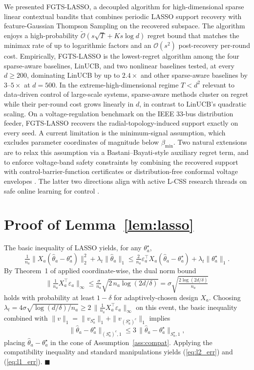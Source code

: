 \documentclass[10pt,journal,twoside,twocolumn]{IEEEtran}
\begin{document}
We presented FGTS-LASSO, a decoupled algorithm for high-dimensional sparse linear contextual bandits that combines periodic LASSO support recovery with feature-Gaussian Thompson Sampling on the recovered subspace. The algorithm enjoys a high-probability $\tilde{\mathcal{O}}(s\sqrt{T} + Ks\log d)$ regret bound that matches the minimax rate of \cite{hao2020high} up to logarithmic factors and an $\mathcal{O}(s^2)$ post-recovery per-round cost. Empirically, FGTS-LASSO is the lowest-regret algorithm among the four sparse-aware baselines, LinUCB, and two nonlinear baselines tested, at every $d \geq 200$, dominating LinUCB by up to $2.4\times$ and other sparse-aware baselines by $3$--$5\times$ at $d = 500$. In the extreme-high-dimensional regime $T < d^2$ relevant to data-driven control of large-scale systems, sparse-aware methods cluster on regret while their per-round cost grows linearly in $d$, in contrast to LinUCB's quadratic scaling. On a voltage-regulation benchmark on the IEEE 33-bus distribution feeder, FGTS-LASSO recovers the radial-topology-induced support exactly on every seed. A current limitation is the minimum-signal assumption, which excludes parameter coordinates of magnitude below $\beta_{\min}$. Two natural extensions are to relax this assumption via a Bastani--Bayati-style auxiliary regret term, and to enforce voltage-band safety constraints by combining the recovered support with control-barrier-function certificates \cite{ames2017cbf} or distribution-free conformal voltage envelopes \cite{vovk2005algorithmic}. The latter two directions align with active L-CSS research threads on safe online learning for control \cite{capone2024learning}.

\appendices

\section{Proof of Lemma~\ref{lem:lasso}}\label{app:lasso}

The basic inequality of LASSO yields, for any $\theta^\star_a$,
\[
\tfrac{1}{n_a}\|X_a(\hat\theta_a - \theta^\star_a)\|_2^2 + \lambda_t \|\hat\theta_a\|_1 \leq \tfrac{2}{n_a}\varepsilon_a^\top X_a (\hat\theta_a - \theta^\star_a) + \lambda_t \|\theta^\star_a\|_1.
\]
By Theorem~1 of \cite{abbasi2011improved} applied coordinate-wise, the dual norm bound
\[
\Big\|\tfrac{1}{n_a} X_a^\top \varepsilon_a\Big\|_\infty \leq \tfrac{\sigma}{n_a}\sqrt{2\, n_a \log(2d/\delta)} = \sigma\sqrt{\tfrac{2\log(2d/\delta)}{n_a}}
\]
holds with probability at least $1 - \delta$ for adaptively-chosen design $X_a$. Choosing $\lambda_t = 4\sigma\sqrt{\log(d/\delta)/n_a} \geq 2\,\|\tfrac{1}{n_a} X_a^\top \varepsilon_a\|_\infty$ on this event, the basic inequality combined with $\|v\|_1 = \|v_{S^\star_a}\|_1 + \|v_{(S^\star_a)^c}\|_1$ implies
\[
\|\hat\theta_a - \theta^\star_a\|_{(S^\star_a)^c, 1} \leq 3\,\|\hat\theta_a - \theta^\star_a\|_{S^\star_a, 1},
\]
placing $\hat\theta_a - \theta^\star_a$ in the cone of Assumption~\ref{ass:compat}. Applying the compatibility inequality and standard manipulations \cite[Sec.~6.2]{vandegeer2009conditions} yields (\ref{eq:l2_err}) and (\ref{eq:l1_err}). \hfill$\blacksquare$
\end{document}
